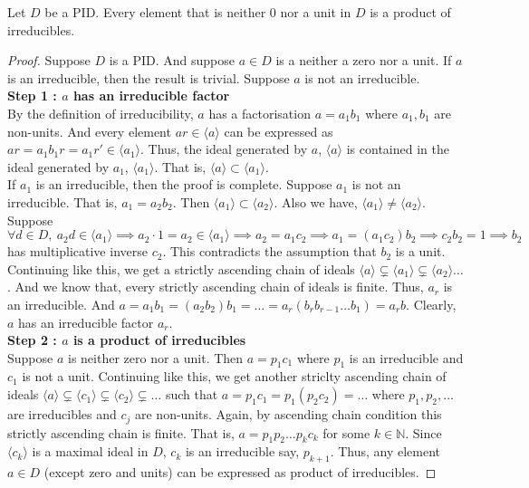 \begin{theorem}
	Let $D$ be a PID.
	Every element that is neither $0$ nor a unit in $D$ is a product of irreducibles.
\end{theorem}
\begin{proof}
	Suppose $D$ is a PID.
	And suppose $a \in D$ is a neither a zero nor a unit.
	If $a$ is an irreducible, then the result is trivial.
	Suppose $a$ is not an irreducible.\\

	\textbf{Step 1 : $a$ has an irreducible factor}\\
	By the definition of irreducibility, $a$ has a factorisation $a = a_1b_1$ where $a_1,b_1$ are non-units.
	And every element $ar \in \langle a \rangle$ can be expressed as $ar = a_1b_1r = a_1r' \in \langle a_1 \rangle$.
	Thus, the ideal generated by $a$, $\langle a \rangle$ is contained in the ideal generated by $a_1$, $\langle a_1 \rangle$.
	That is, $\langle a \rangle \subset \langle a_1 \rangle$.\\

	If $a_1$ is an irreducible, then the proof is complete.
	Suppose $a_1$ is not an irreducible.
	That is, $a_1 = a_2b_2$.
	Then $\langle a_1 \rangle \subset \langle a_2 \rangle$.
	Also we have, $\langle a_1 \rangle \ne \langle a_2 \rangle$.\\

	Suppose $\forall d \in D,\ a_2d \in \langle a_1 \rangle \implies a_2\cdot 1 = a_2 \in \langle a_1 \rangle \implies a_2 = a_1c_2 \implies a_1 = (a_1c_2)b_2 \implies c_2b_2 = 1 \implies b_2$ has multiplicative inverse $c_2$. This contradicts the assumption that $b_2$ is a unit.\\

	Continuing like this, we get a {\color{red}strictly} ascending chain of ideals $\langle a \rangle \subsetneq \langle a_1 \rangle \subsetneq \langle a_2 \rangle \dots $.
	And we know that, every strictly ascending chain of ideals is finite.
	Thus, $a_r$ is an irreducible.
	And $a = a_1b_1 = (a_2b_2)b_1 = \dots = a_r(b_rb_{r-1}\dots b_1) = a_rb$.
	Clearly, $a$ has an irreducible factor $a_r$.\\

	\textbf{Step 2 : $a$ is a product of irreducibles}\\
	Suppose $a$ is neither zero nor a unit.
	Then $a = p_1c_1$ where $p_1$ is an irreducible and $c_1$ is not a unit.
	Continuing like this, we get another striclty ascending chain of ideals $\langle a \rangle \subsetneq \langle c_1 \rangle \subsetneq \langle c_2 \rangle \subsetneq \dots$ such that $a = p_1c_1 = p_1(p_2c_2) = \dots$ where $p_1,p_2,\dots$ are irreducibles and $c_j$ are non-units.
	Again, by ascending chain condition this strictly ascending chain is finite.
	That is, $a = p_1p_2\dots p_kc_k$ for some $k \in \mathbb{N}$.
	Since $\langle c_k \rangle$ is a maximal ideal in $D$, $c_k$ is an irreducible say, $p_{k+1}$.
	Thus, any element $a \in D$ (except zero and units) can be expressed as product of irreducibles.
\end{proof}

